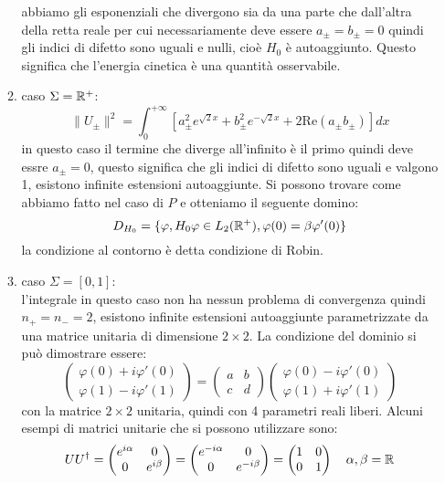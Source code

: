 \begin{itemize}
\begin{enumerate}
abbiamo gli esponenziali che divergono sia da una parte che dall'altra della retta reale per cui necessariamente deve essere $a_\pm=b_\pm = 0$ quindi gli indici di difetto sono uguali e nulli, cioè $H_0$ è autoaggiunto. Questo significa che l'energia cinetica è una quantità osservabile.
\item caso $\Sigma = \mathbb{R}^+$:\\
\[ \|U_\pm\|^2 = \int_{0}^{+\infty}[a_\pm^2e^{\sqrt{2}x} + b_\pm^2e^{-\sqrt{2}x} + 2\text{Re}(a_\pm b_\pm)]dx\]
in questo caso il termine che diverge all'infinito è il primo quindi deve essre $a_\pm = 0$, questo significa che gli indici di difetto sono uguali e valgono 1, esistono infinite estensioni autoaggiunte. Si possono trovare come abbiamo fatto nel caso di $P$ e otteniamo il seguente domino:
\[D_{H_0} = \{\varphi,H_0\varphi\in L_2(\mathbb{R}^+), \varphi(0) = \beta \varphi'(0)\}\]
la condizione al contorno è detta condizione di Robin.
\item caso $\Sigma = [0,1]$:\\
l'integrale in questo caso non ha nessun problema di convergenza quindi $n_+=n_-=2$, esistono infinite estensioni autoaggiunte parametrizzate da una matrice unitaria di dimensione $2\times2$. La condizione del dominio si può dimostrare essere:
\[\begin{pmatrix}
  \varphi(0) +i \varphi'(0) \\
  \varphi(1) -i \varphi'(1)
 \end{pmatrix} = \begin{pmatrix}
  a &b\\
  c & d
 \end{pmatrix}\begin{pmatrix}
  \varphi(0) -i \varphi'(0) \\
 \varphi(1) +i \varphi'(1)
 \end{pmatrix}\]
 con la matrice $2\times2$ unitaria, quindi con 4 parametri reali liberi. Alcuni esempi di matrici unitarie che si possono utilizzare sono:
 \[UU^\dagger = \begin{pmatrix}
  e^{i\alpha} &0\\
  0 & e^{i\beta}
 \end{pmatrix} =\begin{pmatrix}
  e^{-i\alpha} &0\\
  0 & e^{-i\beta}
 \end{pmatrix} = \begin{pmatrix}
  1 &0\\
  0 & 1
 \end{pmatrix}\quad \alpha,\beta=\mathbb{R}\]

\end{enumerate}
\end{itemize}
